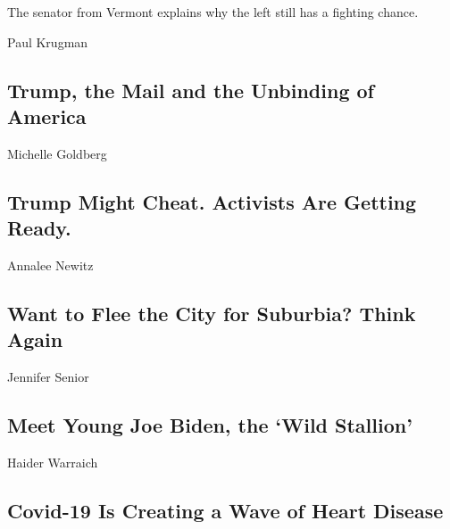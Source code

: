 The senator from Vermont explains why the left still has a fighting
chance.

\href{/2020/08/17/opinion/bernie-sanders-joe-biden.html}{}

\href{/2020/08/17/opinion/trump-us-mail.html}{}

Paul Krugman

\hypertarget{trump-the-mail-and-the-unbinding-of-america}{%
\subsection{Trump, the Mail and the Unbinding of
America}\label{trump-the-mail-and-the-unbinding-of-america}}

\href{/2020/08/17/opinion/trump-contested-election-protests.html}{}

Michelle Goldberg

\hypertarget{trump-might-cheat-activists-are-getting-ready}{%
\subsection{Trump Might Cheat. Activists Are Getting
Ready.}\label{trump-might-cheat-activists-are-getting-ready}}

\href{/2020/08/17/opinion/coronavirus-cities-suburbs.html}{}

Annalee Newitz

\hypertarget{want-to-flee-the-city-for-suburbia-think-again}{%
\subsection{Want to Flee the City for Suburbia? Think
Again}\label{want-to-flee-the-city-for-suburbia-think-again}}

\href{/2020/08/15/opinion/joe-biden-2020-1988-what-it-takes.html}{}

Jennifer Senior

\hypertarget{meet-young-joe-biden-the-wild-stallion}{%
\subsection{Meet Young Joe Biden, the `Wild
Stallion'}\label{meet-young-joe-biden-the-wild-stallion}}

\href{/2020/08/17/opinion/covid-19-heart-disease.html}{}

Haider Warraich

\hypertarget{covid-19-is-creating-a-wave-of-heart-disease}{%
\subsection{Covid-19 Is Creating a Wave of Heart
Disease}\label{covid-19-is-creating-a-wave-of-heart-disease}}

